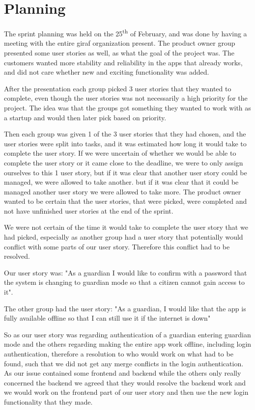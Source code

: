 \section{Planning}
The sprint planning was held on the 25\textsuperscript{th} of February, and was done by having a meeting with the entire giraf organization present. 
The product owner group presented some user stories as well, as what the goal of the project was. 
The customers wanted more stability and reliability in the apps that already works, and did not care whether new and exciting functionality was added. 

After the presentation each group picked 3 user stories that they wanted to complete, even though the user stories was not necessarily a high priority for the project. 
The idea was that the groups got something they wanted to work with as a startup and would then later pick based on priority.

Then each group was given 1 of the 3 user stories that they had chosen, and the user stories were split into tasks, and it was estimated how long it would take to complete the user story. If we were uncertain of whether we would be able to complete the user story or it came close to the deadline, we were to only assign ourselves to this 1 user story, but if it was clear that another user story could be managed, we were allowed to take another.
but if it was clear that it could be managed another user story we were allowed to take more. 
The product owner wanted to be certain that the user stories, that were picked, were completed and not have unfinished user stories at the end of the sprint.

We were not certain of the time it would take to complete the user story that we had picked, especially as another group had a user story that potentially would conflict with some parts of our user story. Therefore this conflict had to be resolved.

Our user story was: "As a guardian I would like to confirm with a password that the system is changing to guardian mode so that a citizen cannot gain access to it".

The other group had the user story: "As a guardian, I would like that the app is fully available offline so that I can still use it if the internet is down"

So as our user story was regarding authentication of a guardian entering guardian mode and the others regarding making the entire app work offline, including login authentication, therefore a resolution to who would work on what had to be found, such that we did not get any merge conflicts in the login authentication. As our issue contained some frontend and backend while the others only really concerned the backend we agreed that they would resolve the backend work and we would work on the frontend part of our user story and then use the new login functionality that they made.
